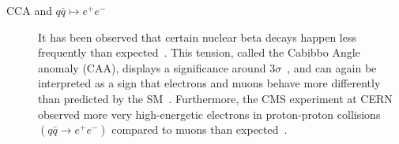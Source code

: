 \begin{description}
	\item[CCA and $q\bar q \mapsto e^+ e^-$] It has been observed that certain nuclear beta decays happen less frequently than expected~\parencite{PhysRevC.102.045501}. This tension, called the Cabibbo Angle anomaly (CAA), displays a significance around $3 \sigma$~\parencite{1674-1137-40-10-100001}, and can again be interpreted as a sign that electrons and muons behave more differently than predicted by the SM~\parencite{PhysRevLett.125.111801}. Furthermore, the CMS experiment at CERN observed more very high-energetic electrons in proton-proton collisions $\left(q \bar{q} \rightarrow e^{+} e^{-}\right)$ compared to muons than expected~\parencite{Sirunyan2021}.
\end{description}
